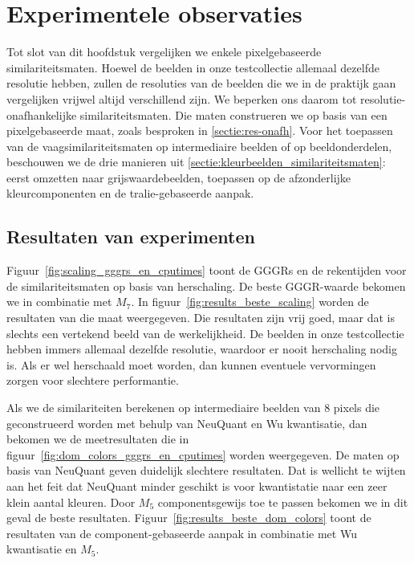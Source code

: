 \section{Experimentele observaties}

Tot slot van dit hoofdstuk vergelijken we enkele pixelgebaseerde similariteitsmaten.
Hoewel de beelden in onze testcollectie allemaal dezelfde resolutie hebben, zullen de
resoluties van de beelden die we in de praktijk gaan vergelijken vrijwel altijd verschillend zijn.
We beperken ons daarom tot resolutie-onafhankelijke similariteitsmaten. Die maten construeren
we op basis van een pixelgebaseerde maat, zoals besproken in \ref{sectie:res-onafh}. 
Voor het toepassen van de vaagsimilariteitsmaten op
intermediaire beelden of op beeldonderdelen, beschouwen we de drie manieren uit \ref{sectie:kleurbeelden_similariteitsmaten}:
eerst omzetten naar grijswaardebeelden, 
toepassen op de afzonderlijke kleurcomponenten en 
de tralie-gebaseerde aanpak.

\subsection{Resultaten van experimenten}

Figuur~\ref{fig:scaling_gggrs_en_cputimes} toont de GGGRs en de rekentijden voor de 
similariteitsmaten op basis van herschaling. De beste GGGR-waarde bekomen we in combinatie
met $M_7$. In figuur~\ref{fig:results_beste_scaling} worden de resultaten van die maat
weergegeven. Die resultaten zijn vrij goed, maar dat is slechts een vertekend beeld van de
werkelijkheid. De beelden in onze testcollectie hebben immers allemaal dezelfde resolutie,
waardoor er nooit herschaling nodig is. Als er wel herschaald moet worden, dan kunnen
eventuele vervormingen zorgen voor slechtere performantie. 

Als we de similariteiten berekenen op intermediaire beelden van 8 pixels die 
geconstrueerd worden met behulp van NeuQuant en Wu kwantisatie, dan bekomen we
de meetresultaten die in figuur~\ref{fig:dom_colors_gggrs_en_cputimes} worden weergegeven.
De maten op basis van NeuQuant geven duidelijk slechtere resultaten. Dat is wellicht te wijten
aan het feit dat NeuQuant minder geschikt is voor kwantistatie naar een zeer klein aantal 
kleuren. Door $M_5$ componentsgewijs toe te passen bekomen we in dit geval de beste resultaten. 
Figuur~\ref{fig:results_beste_dom_colors} toont de resultaten van de component-gebaseerde aanpak
in combinatie met Wu kwantisatie en $M_5$.

